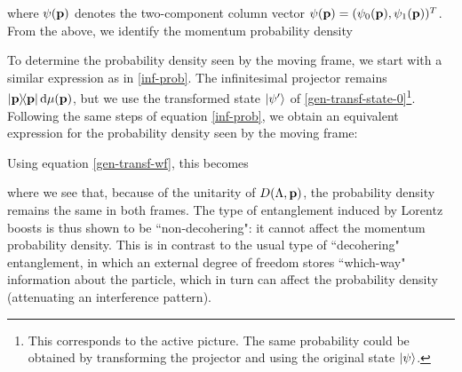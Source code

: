 \documentclass[12pt,a4paper,notitlepage]{report}
\begin{document}
%
where $\psi(\vb{p})$ denotes the two-component column vector $\psi(\vb{p}) = (\psi_0(\vb{p}), \psi_1(\vb{p}))^T$. From the above, we identify the momentum probability density 


To determine the probability density seen by the moving frame, we start with a similar expression as in \eqref{inf-prob}. The infinitesimal projector remains $\dyad{\vb{p}}\dd{\mu(\vb{p})}$, but we use the transformed state $\ket{\psi'}$ of \eqref{gen-transf-state-0}\footnote{This corresponds to the active picture. The same probability could be obtained by transforming the projector and using the original state $\ket{\psi}$.}. Following the same steps of equation \eqref{inf-prob}, we obtain an equivalent expression for the probability density seen by the moving frame:

Using equation \eqref{gen-transf-wf}, this becomes

%
where we see that, because of the unitarity of $D(\Lambda, \vb{p})$, the probability density remains the same in both frames. The type of entanglement induced by Lorentz boosts is thus shown to be ``non-decohering": it cannot affect the momentum probability density. This is in contrast to the usual type of ``decohering" entanglement, in which an external degree of freedom stores ``which-way" information about the particle, which in turn can affect the probability density (attenuating an interference pattern).

\end{document}
